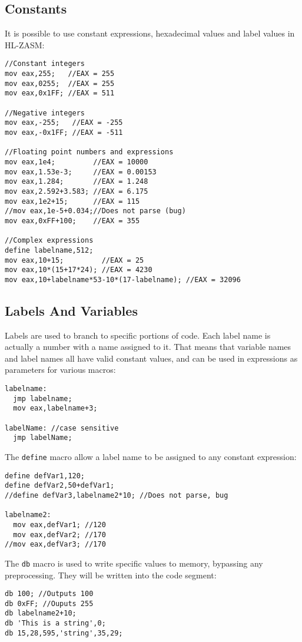 \subsection{Constants}
It is possible to use constant expressions, hexadecimal values and label values in HL-ZASM:
\begin{verbatim}
//Constant integers
mov eax,255;   //EAX = 255
mov eax,0255;  //EAX = 255
mov eax,0x1FF; //EAX = 511

//Negative integers
mov eax,-255;   //EAX = -255
mov eax,-0x1FF; //EAX = -511

//Floating point numbers and expressions
mov eax,1e4;         //EAX = 10000
mov eax,1.53e-3;     //EAX = 0.00153
mov eax,1.284;       //EAX = 1.248
mov eax,2.592+3.583; //EAX = 6.175
mov eax,1e2+15;      //EAX = 115
//mov eax,1e-5+0.034;//Does not parse (bug)
mov eax,0xFF+100;    //EAX = 355

//Complex expressions
define labelname,512;
mov eax,10+15;         //EAX = 25
mov eax,10*(15+17*24); //EAX = 4230
mov eax,10+labelname*53-10*(17-labelname); //EAX = 32096
\end{verbatim}


\subsection{Labels And Variables}
Labels are used to branch to specific portions of code. Each label name is actually a number with a name assigned to it. That means that variable names and label names all have valid constant values, and can be used in expressions as parameters for various macros:
\begin{verbatim}
labelname:
  jmp labelname;
  mov eax,labelname+3;

labelName: //case sensitive
  jmp labelName;
\end{verbatim}

The \texttt{define} macro allow a label name to be assigned to any constant expression:
\begin{verbatim}
define defVar1,120;
define defVar2,50+defVar1;
//define defVar3,labelname2*10; //Does not parse, bug

labelname2:
  mov eax,defVar1; //120
  mov eax,defVar2; //170
//mov eax,defVar3; //170
\end{verbatim}

The \texttt{db} macro is used to write specific values to memory, bypassing any preprocessing. They will be written into the code segment:
\begin{verbatim}
db 100; //Outputs 100
db 0xFF; //Ouputs 255
db labelname2+10;
db 'This is a string',0;
db 15,28,595,'string',35,29;
\end{verbatim}

